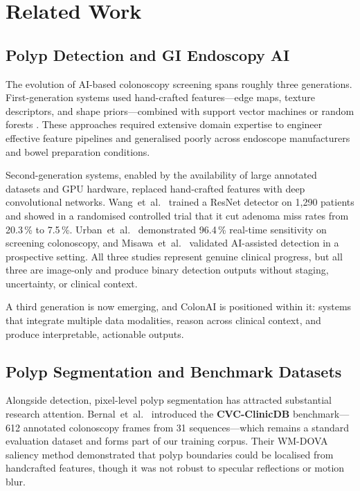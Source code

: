 \documentclass[conference]{IEEEtran}
\begin{document}
\section{Related Work}

\subsection{Polyp Detection and GI Endoscopy AI}

The evolution of AI-based colonoscopy screening spans roughly three generations.
First-generation systems used hand-crafted features---edge maps, texture
descriptors, and shape priors---combined with support vector machines or random
forests \cite{tajbakhsh2016}. These approaches required extensive domain
expertise to engineer effective feature pipelines and generalised poorly across
endoscope manufacturers and bowel preparation conditions.

Second-generation systems, enabled by the availability of large annotated datasets
and GPU hardware, replaced hand-crafted features with deep convolutional networks.
Wang~et~al.~\cite{wang2018} trained a ResNet detector on 1,290 patients and
showed in a randomised controlled trial that it cut adenoma miss rates from
20.3\,\% to 7.5\,\%. Urban~et~al.~\cite{urban2018} demonstrated 96.4\,\%
real-time sensitivity on screening colonoscopy, and Misawa~et~al.~\cite{misawa2018}
validated AI-assisted detection in a prospective setting. All three studies
represent genuine clinical progress, but all three are image-only and produce
binary detection outputs without staging, uncertainty, or clinical context.

A third generation is now emerging, and ColonAI is positioned within it:
systems that integrate multiple data modalities, reason across clinical context,
and produce interpretable, actionable outputs.

\subsection{Polyp Segmentation and Benchmark Datasets}

Alongside detection, pixel-level polyp segmentation has attracted substantial
research attention. Bernal~et~al.~\cite{bernal2015} introduced the
\textbf{CVC-ClinicDB} benchmark---612 annotated colonoscopy frames from 31
sequences---which remains a standard evaluation dataset and forms part of our
training corpus. Their WM-DOVA saliency method demonstrated that polyp boundaries
could be localised from handcrafted features, though it was not robust to
specular reflections or motion blur.
\end{document}
